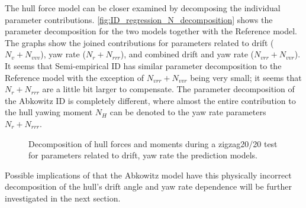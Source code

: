 The hull force model can be closer examined by decomposing the individual parameter contributions. \autoref{fig:ID_regression_N_decomposition} shows the parameter decomposition for the two models together with the Reference model. The graphs show the joined contributions for parameters related to drift ($N_v+N_{vvv}$), yaw rate ($N_r+N_{rrr}$), and combined drift and yaw rate ($N_{vrr}+N_{vvr}$). It seems that Semi-empirical ID has similar parameter decomposition to the Reference model with the exception of $N_{vrr}+N_{vvr}$ being very small; it seems that $N_r+N_{rrr}$ are a little bit larger to compensate.
The parameter decomposition of the Abkowitz ID is completely different, where almost the entire contribution to the hull yawing moment $N_H$ can be denoted to the yaw rate parameters $N_r+N_{rrr}$. 
\begin{figure}[h]
    \begin{center}
        
        \caption{Decomposition of hull forces and moments during a zigzag20/20 test for parameters related to drift, yaw rate the prediction models.}
        \label{fig:ID_regression_N_decomposition}
    \end{center}
\end{figure}

Possible implications of that the Abkowitz model have this physically incorrect decomposition of the hull's drift angle and yaw rate dependence will be further investigated in the next section.
